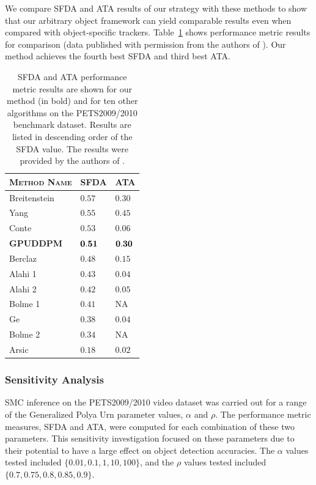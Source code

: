 \documentclass[twocolumn, final]{svjour3}
\begin{document}
We compare SFDA and ATA results of our strategy with these methods to show that our arbitrary object framework can yield comparable results even when compared with object-specific trackers. Table~\ref{benchmark_results_table} shows performance metric results for comparison (data published with permission from the authors of \cite{ellis_2010}). Our method achieves the fourth best SFDA and third best ATA.

\begin{table}
\begin{tabular}[!] {| l | l | l |}
  \hline
  \textsc{Method Name} & \textsc{SFDA}  & \textsc{ATA} \\ \hline \hline
  Breitenstein \cite{breitenstein2009markovian} & $ 0.57 $ & $0.30$ \\ \hline
  Yang \cite{yang2009probabilistic} & $ 0.55 $ & $0.45$ \\ \hline
  Conte \cite{conte2010performance} & $ 0.53  $ & $0.06$ \\ \hline
  \textbf{GPUDDPM} & $ \bold{0.51} $ & $\bold{0.30}$ \\ \hline
  Berclaz \cite{berclaz2009multiple} & $ 0.48 $ & $0.15$ \\ \hline
  Alahi 1 \cite{alahi2009sparsity} & $ 0.43 $ & $0.04$ \\ \hline
  Alahi 2 \cite{alahi2009sparsity} & $ 0.42 $ & $0.05$ \\ \hline
  Bolme 1 \cite{bolme2009simple} & $ 0.41 $ & NA \\ \hline
  Ge \cite{ge2009evaluation} & $ 0.38 $ & $0.04$ \\ \hline
  Bolme 2 \cite{bolme2009simple} & $ 0.34 $ & NA \\ \hline
  Arsic \cite{arsic2009multi} & $ 0.18 $ & $0.02$ \\
  \hline
\end{tabular}
\caption{SFDA and ATA performance metric results are shown for our method (in bold) and for ten other algorithms on the PETS2009/2010 benchmark dataset. Results are listed in descending order of the SFDA value. The results were provided by the authors of \cite{ellis_2010}.}
\label{benchmark_results_table}
\end{table}


\subsubsection{Sensitivity Analysis}
\label{sec:sensitivityanalysis}

SMC inference on the PETS2009/2010 video dataset was carried out for a range of the Generalized Polya Urn parameter values, $\alpha$ and $\rho$. The performance metric measures, SFDA and ATA, were computed for each combination of these two parameters. This sensitivity investigation focused on these parameters due to their potential to have a large effect on object detection accuracies. The $\alpha$ values tested included $\{ 0.01, 0.1, 1, 10, 100 \}$, and the $\rho$ values tested included $\{ 0.7, 0.75, 0.8, 0.85, 0.9 \}$.
\end{document}
